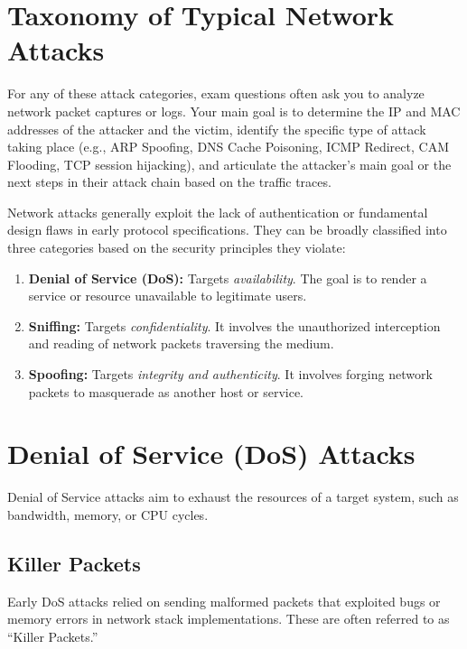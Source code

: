 \section{Taxonomy of Typical Network Attacks}

\begin{tcolorbox}[colback=blue!5!white,colframe=blue!75!black,title=Exam Insight]
For any of these attack categories, exam questions often ask you to analyze network packet captures or logs. Your main goal is to determine the IP and MAC addresses of the attacker and the victim, identify the specific type of attack taking place (e.g., ARP Spoofing, DNS Cache Poisoning, ICMP Redirect, CAM Flooding, TCP session hijacking), and articulate the attacker's main goal or the next steps in their attack chain based on the traffic traces.
\end{tcolorbox}

Network attacks generally exploit the lack of authentication or fundamental design flaws in early protocol specifications. They can be broadly classified into three categories based on the security principles they violate:

\begin{enumerate}
    \item \textbf{Denial of Service (DoS):} Targets \textit{availability}. The goal is to render a service or resource unavailable to legitimate users.
    \item \textbf{Sniffing:} Targets \textit{confidentiality}. It involves the unauthorized interception and reading of network packets traversing the medium.
    \item \textbf{Spoofing:} Targets \textit{integrity and authenticity}. It involves forging network packets to masquerade as another host or service.
\end{enumerate}

\section{Denial of Service (DoS) Attacks}

Denial of Service attacks aim to exhaust the resources of a target system, such as bandwidth, memory, or CPU cycles.

\subsection{Killer Packets}
Early DoS attacks relied on sending malformed packets that exploited bugs or memory errors in network stack implementations. These are often referred to as ``Killer Packets.''

